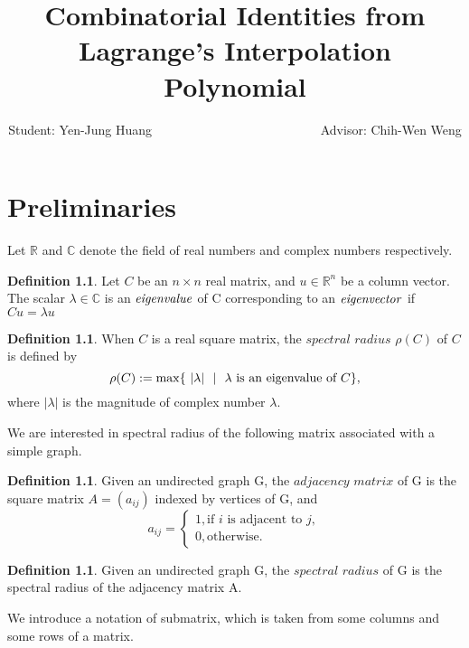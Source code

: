 \documentclass[12pt]{report}%
\title{Combinatorial Identities from Lagrange's Interpolation Polynomial}
\author{Student: Yen-Jung Huang  ~~~~~~~~~~~~~~~~~~~~~~~~~~Advisor: Chih-Wen Weng}
\date{} %
\theoremstyle{plain}
\theoremstyle{definition}
\newtheorem{defn}[thm]{Definition}
\begin{document}
\chapter{Preliminaries}

Let $\mathbb{R}$ and $\mathbb{C}$ denote the field of real numbers and complex numbers respectively.


\begin{defn}
    Let $C$ be an $n \times n$ real matrix, and $u \in \mathbb{R}^n$ be a column vector. The scalar $\lambda \in \mathbb{C}$ is an $\it{eigenvalue}$ of C corresponding to an $\it{eigenvector}$ if $Cu = \lambda u$ 
   
\end{defn}

\begin{defn}

When $C$ is a real square matrix, the $\textit {spectral radius} $ $\rho(C)$ of $C$ is defined by
$$\rho(C):=\max\{~|\lambda|~\ |~~\lambda\hbox{ is an eigenvalue of $C$}\},$$
where $|\lambda|$ is the magnitude of complex number $\lambda.$
\end{defn}

We are interested in spectral radius of the following matrix associated with a simple graph.

\begin{defn} Given an undirected graph
G, the$\textit{ adjacency matrix}$ of G is the square matrix $A = (a_{ij})$ indexed by vertices of G,
and
\[a_{ij} =\begin{cases}
1, \text{if $i$ is adjacent to $j$}, \\
0, \text{otherwise.}
\end{cases}
\]

\end{defn}

\begin{defn}
Given an undirected graph G, the $\textit{spectral radius}$ of G is the spectral radius of the adjacency matrix A.
\end{defn}



    We introduce a notation of submatrix, which is taken from some columns and some rows of a matrix.
\end{document}
